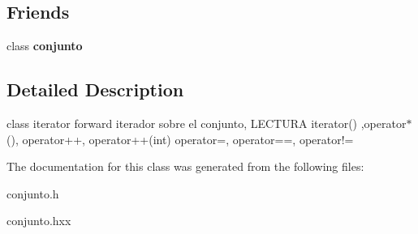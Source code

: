 \subsection*{Friends}
\begin{DoxyCompactItemize}
\item 
\hypertarget{classconjunto_1_1iterator_a42fdcda39c77eabd7380e29fcdbe5dd2}{}class {\bfseries conjunto}\label{classconjunto_1_1iterator_a42fdcda39c77eabd7380e29fcdbe5dd2}

\end{DoxyCompactItemize}


\subsection{Detailed Description}
class iterator forward iterador sobre el conjunto, L\+E\+C\+T\+U\+R\+A iterator() ,operator$\ast$(), operator++, operator++(int) operator=, operator==, operator!= 

The documentation for this class was generated from the following files\+:\begin{DoxyCompactItemize}
\item 
conjunto.\+h\item 
conjunto.\+hxx\end{DoxyCompactItemize}
